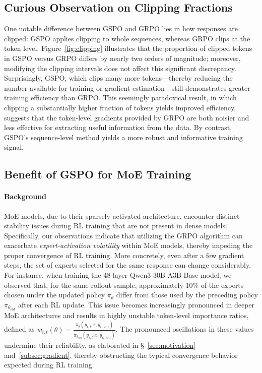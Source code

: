\subsection{Curious Observation on Clipping Fractions}

One notable difference between GSPO and GRPO lies in how responses are clipped: GSPO applies clipping to whole sequences, whereas GRPO clips at the token level. Figure~\ref{fig:clipping} illustrates that the proportion of clipped tokens in GSPO versus GRPO differs by nearly two orders of magnitude; moreover, modifying the clipping intervals does not affect this significant discrepancy. Surprisingly, GSPO, which clips many more tokens—thereby reducing the number available for training or gradient estimation—still demonstrates greater training efficiency than GRPO. This seemingly paradoxical result, in which clipping a substantially higher fraction of tokens yields improved efficiency, suggests that the token-level gradients provided by GRPO are both noisier and less effective for extracting useful information from the data. By contrast, GSPO’s sequence-level method yields a more robust and informative training signal.

\subsection{Benefit of GSPO for MoE Training}
\label{subsec:routing_replay}

\paragraph{Background}
MoE models, due to their sparsely activated architecture, encounter distinct stability issues during RL training that are not present in dense models. Specifically, our observations indicate that utilizing the GRPO algorithm can exacerbate \textit{expert-activation volatility} within MoE models, thereby impeding the proper convergence of RL training. More concretely, even after a few gradient steps, the set of experts selected for the same response can change considerably. For instance, when training the 48-layer Qwen3-30B-A3B-Base model, we observed that, for the same rollout sample, approximately 10\% of the experts chosen under the updated policy $\pi_{\theta}$ differ from those used by the preceding policy $\pi_{\theta_\text{old}}$ after each RL update. This issue becomes increasingly pronounced in deeper MoE architectures and results in highly unstable token-level importance ratios, defined as $w_{i,t}(\theta) = \frac{ \pi_{\theta} (y_{i,t} | x, y_{i,<t}) }{ \pi_{\theta_\text{old}} (y_{i,t} | x,y_{i,<t})}$. The pronounced oscillations in these values undermine their reliability, as elaborated in \S~\ref{sec:motivation} and~\ref{subsec:gradient}, thereby obstructing the typical convergence behavior expected during RL training.

